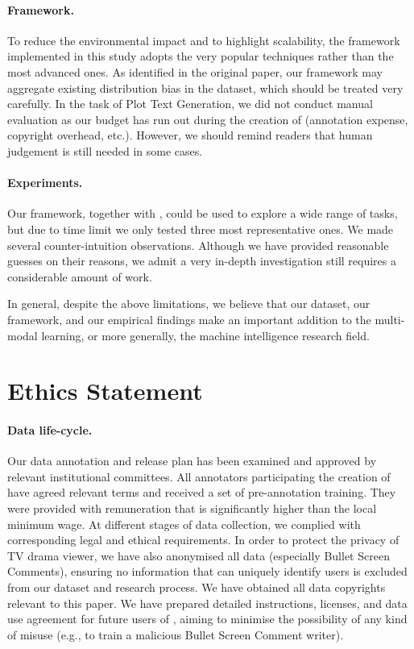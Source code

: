 \paragraph{Framework.}
To reduce the environmental impact and to highlight scalability, the framework implemented in this study adopts the very popular techniques rather than the most advanced ones.
As identified in the original paper, our framework may aggregate existing distribution bias in the dataset, which should be treated very carefully.
In the task of Plot Text Generation, we did not conduct manual evaluation as our budget has run out during the creation of \TVD (annotation expense, copyright overhead, etc.).
However, we should remind readers that human judgement is still needed in some cases.

\paragraph{Experiments.}
Our framework, together with \TVD, could be used to explore a wide range of tasks, but due to time limit we only tested three most representative ones.
We made several counter-intuition observations. Although we have provided reasonable guesses on their reasons, we admit a very in-depth investigation still requires a considerable amount of work.

In general, despite the above limitations, we believe that our dataset, our framework, and our empirical findings make an important addition to the multi-modal learning, or more generally, the machine intelligence research field. 

\section{Ethics Statement}
\label{sec:ethics}

\paragraph{Data life-cycle.}
Our data annotation and release plan has been examined and approved by relevant institutional committees.
All annotators participating the creation of \TVD have agreed relevant terms and received a set of pre-annotation training.
They were provided with remuneration that is significantly higher than the local minimum wage.
At different stages of data collection, we complied with corresponding legal and ethical requirements.
In order to protect the privacy of TV drama viewer, we have also anonymised all data (especially Bullet Screen Comments), ensuring no information that can uniquely identify users is excluded from our dataset and research process.
We have obtained all data copyrights relevant to this paper.
We have prepared detailed instructions, licenses, and data use agreement for future users of \TVD, aiming to minimise the possibility of any kind of misuse (e.g., to train a malicious Bullet Screen Comment writer).



